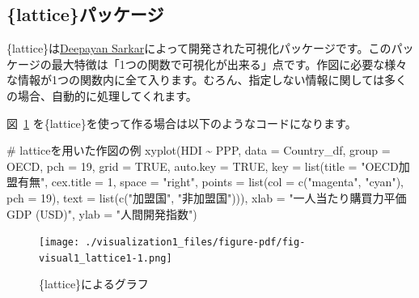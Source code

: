 \documentclass[
  a4paper,
  pandoc,
  ja=standard,
  jafont=haranoaji]{bxjsbook}
\newenvironment{Shaded}{\begin{snugshade}}{\end{snugshade}}
\newcommand{\AttributeTok}[1]{\textcolor[rgb]{0.00,0.48,0.65}{#1}}
\newcommand{\CommentTok}[1]{\textcolor[rgb]{0.37,0.37,0.37}{#1}}
\newcommand{\ConstantTok}[1]{\textcolor[rgb]{0.56,0.35,0.01}{#1}}
\newcommand{\DecValTok}[1]{\textcolor[rgb]{0.68,0.00,0.00}{#1}}
\newcommand{\FunctionTok}[1]{\textcolor[rgb]{0.28,0.35,0.67}{#1}}
\newcommand{\NormalTok}[1]{\textcolor[rgb]{0.00,0.48,0.65}{#1}}
\newcommand{\SpecialCharTok}[1]{\textcolor[rgb]{0.37,0.37,0.37}{#1}}
\newcommand{\StringTok}[1]{\textcolor[rgb]{0.13,0.47,0.30}{#1}}
\begin{document}
\hypertarget{latticeux30d1ux30c3ux30b1ux30fcux30b8}{%
\subsection{\{lattice\}パッケージ}\label{latticeux30d1ux30c3ux30b1ux30fcux30b8}}

\{lattice\}は\href{https://www.isid.ac.in/~deepayan/}{Deepayan
Sarkar}によって開発された可視化パッケージです。このパッケージの最大特徴は「1つの関数で可視化が出来る」点です。作図に必要な様々な情報が1つの関数内に全て入ります。むろん、指定しない情報に関しては多くの場合、自動的に処理してくれます。

図~\ref{fig-visual1_lattice1}
を\{lattice\}を使って作る場合は以下のようなコードになります。

\begin{Shaded}
\begin{Highlighting}[numbers=left,,]
\CommentTok{\# latticeを用いた作図の例}
\FunctionTok{xyplot}\NormalTok{(HDI }\SpecialCharTok{\textasciitilde{}}\NormalTok{ PPP, }\AttributeTok{data =}\NormalTok{ Country\_df,}
       \AttributeTok{group =}\NormalTok{ OECD, }\AttributeTok{pch =} \DecValTok{19}\NormalTok{, }\AttributeTok{grid =} \ConstantTok{TRUE}\NormalTok{,}
       \AttributeTok{auto.key =} \ConstantTok{TRUE}\NormalTok{,}
       \AttributeTok{key =} \FunctionTok{list}\NormalTok{(}\AttributeTok{title     =} \StringTok{"OECD加盟有無"}\NormalTok{,}
                  \AttributeTok{cex.title =} \DecValTok{1}\NormalTok{,}
                  \AttributeTok{space     =} \StringTok{"right"}\NormalTok{,}
                  \AttributeTok{points    =} \FunctionTok{list}\NormalTok{(}\AttributeTok{col =} \FunctionTok{c}\NormalTok{(}\StringTok{"magenta"}\NormalTok{, }\StringTok{"cyan"}\NormalTok{),}
                                   \AttributeTok{pch =} \DecValTok{19}\NormalTok{),}
                  \AttributeTok{text      =} \FunctionTok{list}\NormalTok{(}\FunctionTok{c}\NormalTok{(}\StringTok{"加盟国"}\NormalTok{, }\StringTok{"非加盟国"}\NormalTok{))), }
       \AttributeTok{xlab =} \StringTok{"一人当たり購買力平価GDP (USD)"}\NormalTok{, }\AttributeTok{ylab =} \StringTok{"人間開発指数"}\NormalTok{)}
\end{Highlighting}
\end{Shaded}

\begin{figure}[H]

{\centering \texttt{[image: ./visualization1\_files/figure-pdf/fig-visual1\_lattice1-1.png]}

}

\caption{\label{fig-visual1_lattice1}\{lattice\}によるグラフ}

\end{figure}
\end{document}
